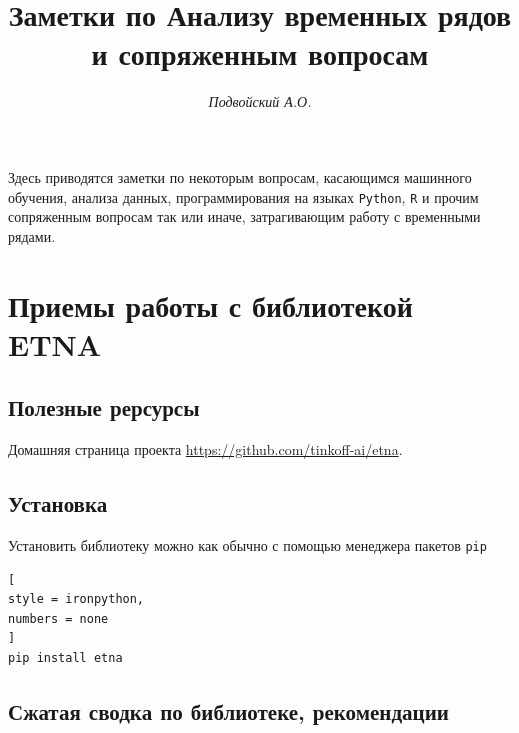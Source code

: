 \documentclass[%
	11pt,
	a4paper,
	utf8,
		]{article}
\begin{document}
\title{Заметки по Анализу временных рядов и сопряженным вопросам}

\author{\itshape Подвойский А.О.}

\date{}
\maketitle

\thispagestyle{fancy}

Здесь приводятся заметки по некоторым вопросам, касающимся машинного обучения, анализа данных, программирования на языках \texttt{Python}, \texttt{R} и прочим сопряженным вопросам так или иначе, затрагивающим работу с временными рядами.



\tableofcontents

\section{Приемы работы с библиотекой ETNA}

\subsection{Полезные рерсурсы}

Домашняя страница проекта \url{https://github.com/tinkoff-ai/etna}.

\subsection{Установка}

Установить библиотеку можно как обычно с помощью менеджера пакетов \verb|pip|
\begin{lstlisting}[
style = ironpython,
numbers = none
]
pip install etna
\end{lstlisting}

\subsection{Сжатая сводка по библиотеке, рекомендации}
\end{document}

